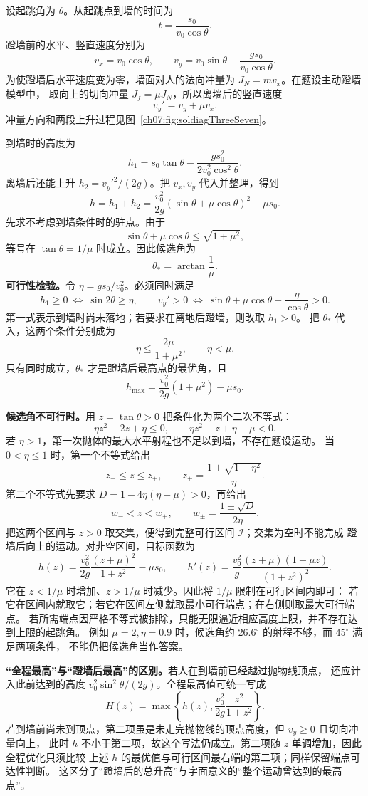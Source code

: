{\begin{xesolution}
设起跳角为 $\theta$。从起跳点到墙的时间为
\[
 t=\frac{s_0}{v_0\cos\theta}.
\]
蹬墙前的水平、竖直速度分别为
\[
 v_x=v_0\cos\theta,
 \qquad
 v_y=v_0\sin\theta-\frac{gs_0}{v_0\cos\theta}.
\]
为使蹬墙后水平速度变为零，墙面对人的法向冲量为 $J_N=mv_x$。在题设主动蹬墙模型中，
取向上的切向冲量 $J_f=\mu J_N$，所以离墙后的竖直速度
\[
 v_y'=v_y+\mu v_x.
\]
冲量方向和两段上升过程见图~\ref{ch07:fig:soldiagThreeSeven}。

\soldiagThreeSeven
到墙时的高度为
\[
 h_1=s_0\tan\theta-\frac{gs_0^2}{2v_0^2\cos^2\theta}.
\]
离墙后还能上升 $h_2={v_y'}^2/(2g)$。把 $v_x,v_y$ 代入并整理，得到
\[
 h=h_1+h_2
 =\frac{v_0^2}{2g}(\sin\theta+\mu\cos\theta)^2-\mu s_0.
\]
先求不考虑到墙条件时的驻点。由于
\[
 \sin\theta+\mu\cos\theta
 \le\sqrt{1+\mu^2},
\]
等号在 $\tan\theta=1/\mu$ 时成立。因此候选角为
\[
 \theta_* =\arctan\frac{1}{\mu}.
\]
\textbf{可行性检验。}\quad 令 $\eta=gs_0/v_0^2$。必须同时满足
\[
 h_1\ge0\ \Longleftrightarrow\ \sin2\theta\ge\eta,
 \qquad
 v_y'>0\ \Longleftrightarrow\
 \sin\theta+\mu\cos\theta-\frac{\eta}{\cos\theta}>0.
\]
第一式表示到墙时尚未落地；若要求在离地后蹬墙，则改取 $h_1>0$。
把 $\theta_*$ 代入，这两个条件分别成为
\[
 \eta\le\frac{2\mu}{1+\mu^2},\qquad \eta<\mu.
\]
只有同时成立，$\theta_*$ 才是蹬墙后最高点的最优角，且
\[
 h_{\max}=\frac{v_0^2}{2g}(1+\mu^2)-\mu s_0.
\]

\textbf{候选角不可行时。}\quad 用 $z=\tan\theta>0$ 把条件化为两个二次不等式：
\[
 \eta z^2-2z+\eta\le0,
 \qquad
 \eta z^2-z+\eta-\mu<0.
\]
若 $\eta>1$，第一次抛体的最大水平射程也不足以到墙，不存在题设运动。
当 $0<\eta\le1$ 时，第一个不等式给出
\[
 z_-\le z\le z_+,
 \qquad z_\pm=\frac{1\pm\sqrt{1-\eta^2}}{\eta}.
\]
第二个不等式先要求 $D=1-4\eta(\eta-\mu)>0$，再给出
\[
 w_-<z<w_+,\qquad w_\pm=\frac{1\pm\sqrt D}{2\eta}.
\]
把这两个区间与 $z>0$ 取交集，便得到完整可行区间 $\mathcal I$；交集为空时不能完成
蹬墙后向上的运动。对非空区间，目标函数为
\[
 h(z)=\frac{v_0^2}{2g}\frac{(z+\mu)^2}{1+z^2}-\mu s_0,
 \qquad
 h'(z)=\frac{v_0^2}{g}\frac{(z+\mu)(1-\mu z)}{(1+z^2)^2}.
\]
它在 $z<1/\mu$ 时增加、$z>1/\mu$ 时减少。因此将 $1/\mu$ 限制在可行区间内即可：
若它在区间内就取它；若它在区间左侧就取最小可行端点；在右侧则取最大可行端点。
若所需端点因严格不等式被排除，只能无限逼近相应高度上限，并不存在达到上限的起跳角。
例如 $\mu=2,\eta=0.9$ 时，候选角约 $26.6^\circ$ 的射程不够，而 $45^\circ$ 满足两项条件，
不能仍把候选角当作答案。

\textbf{“全程最高”与“蹬墙后最高”的区别。}\quad 若人在到墙前已经越过抛物线顶点，
还应计入此前达到的高度 $v_0^2\sin^2\theta/(2g)$。全程最高值可统一写成
\[
 H(z)=\max\left\{h(z),\frac{v_0^2}{2g}\frac{z^2}{1+z^2}\right\}.
\]
若到墙前尚未到顶点，第二项虽是未走完抛物线的顶点高度，但 $v_y\ge0$ 且切向冲量向上，
此时 $h$ 不小于第二项，故这个写法仍成立。第二项随 $z$ 单调增加，因此全程优化只须比较
上述 $h$ 的最优值与可行区间最右端的第二项；同样保留端点可达性判断。
这区分了“蹬墙后的总升高”与字面意义的“整个运动曾达到的最高点”。
\end{xesolution}

}
